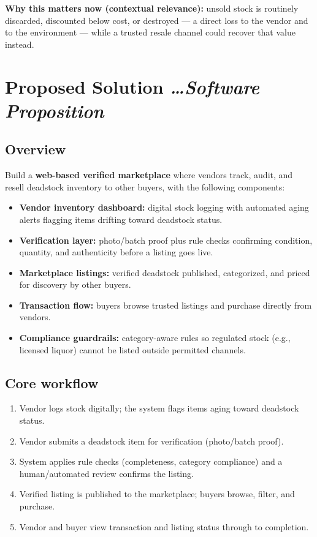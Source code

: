 \documentclass[11pt,a4paper]{article}
\newcommand{\BvrHint}[1]{%
  {\normalfont\normalsize\itshape\hfill #1}}
\begin{document}
\textbf{Why this matters now (contextual relevance):} unsold stock is routinely discarded, discounted below cost, or destroyed --- a direct loss to the vendor and to the environment --- while a trusted resale channel could recover that value instead.

\section{Proposed Solution %
\BvrHint{\ldots Software Proposition}}
\subsection{Overview}
Build a \textbf{web-based verified marketplace} where
vendors track, audit, and resell deadstock inventory to
other buyers, with the following components:
\begin{itemize}[leftmargin=0.7cm]
    \item \textbf{Vendor inventory dashboard:} digital stock logging with automated aging alerts flagging items drifting toward deadstock status.
    \item \textbf{Verification layer:} photo/batch proof plus rule checks confirming condition, quantity, and authenticity before a listing goes live.
    \item \textbf{Marketplace listings:} verified deadstock published, categorized, and priced for discovery by other buyers.
    \item \textbf{Transaction flow:} buyers browse trusted listings and purchase directly from vendors.
    \item \textbf{Compliance guardrails:} category-aware rules so regulated stock (e.g., licensed liquor) cannot be listed outside permitted channels.
\end{itemize}

\subsection{Core workflow}
\begin{enumerate}[leftmargin=0.7cm]
    \item Vendor logs stock digitally; the system flags items aging toward deadstock status.
    \item Vendor submits a deadstock item for verification (photo/batch proof).
    \item System applies rule checks (completeness, category compliance) and a human/automated review confirms the listing.
    \item Verified listing is published to the marketplace; buyers browse, filter, and purchase.
    \item Vendor and buyer view transaction and listing status through to completion.
\end{enumerate}
\end{document}
